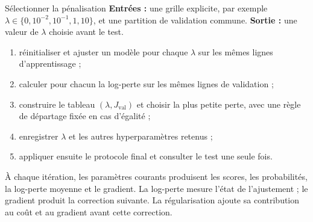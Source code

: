 \begin{procedure}{Sélectionner la pénalisation}
\textbf{Entrées :} une grille explicite, par exemple
$\lambda\in\{0,10^{-2},10^{-1},1,10\}$, et une partition de validation commune.
\textbf{Sortie :} une valeur de $\lambda$ choisie avant le test.
\begin{enumerate}
  \item réinitialiser et ajuster un modèle pour chaque $\lambda$ sur les mêmes
        lignes d'apprentissage ;
  \item calculer pour chacun la log-perte sur les mêmes lignes de validation ;
  \item construire le tableau $(\lambda,J_{\mathrm{val}})$ et choisir la plus
        petite perte, avec une règle de départage fixée en cas d'égalité ;
  \item enregistrer $\lambda$ et les autres hyperparamètres retenus ;
  \item appliquer ensuite le protocole final et consulter le test une seule fois.
\end{enumerate}
\end{procedure}

\begin{resultat}
À chaque itération, les paramètres courants produisent les scores, les
probabilités, la log-perte moyenne et le gradient. La log-perte mesure l'état de
l'ajustement ; le gradient produit la correction suivante. La régularisation
ajoute sa contribution au coût et au gradient avant cette correction.
\end{resultat}
